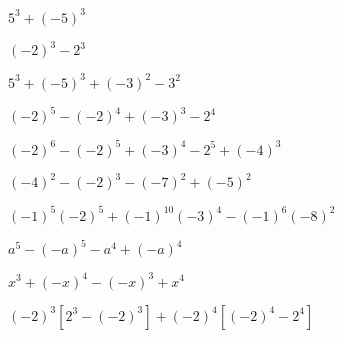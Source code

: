 
\begin{BloqueEjercicios}
  \begin{ej2col}
    \item $5^3+(-5)^3$ %
    \item $(-2)^3-2^3$ %
    \item $5^3+(-5)^3+(-3)^2-3^2$ %
    \item $(-2)^5-(-2)^4+(-3)^3-2^4$ %
    \item $(-2)^6 - (-2)^5+(-3)^4-2^5+(-4)^3$
    \item $(-4)^2-(-2)^3-(-7)^2+(-5)^2$ %
    \item $(-1)^5(-2)^5+(-1)^{10}(-3)^4-(-1)^6(-8)^2$ %
    \item $a^5-(-a)^5-a^4+(-a)^4$ %
    \item $x^3+(-x)^4-(-x)^3+x^4$ %
    \item $(-2)^3\left[2^3-(-2)^3\right]+(-2)^4\left[(-2)^4-2^4\right]$ %
  \end{ej2col}

  \vspace{.6\baselineskip}
  \noindent{}
  \end{BloqueEjercicios}


